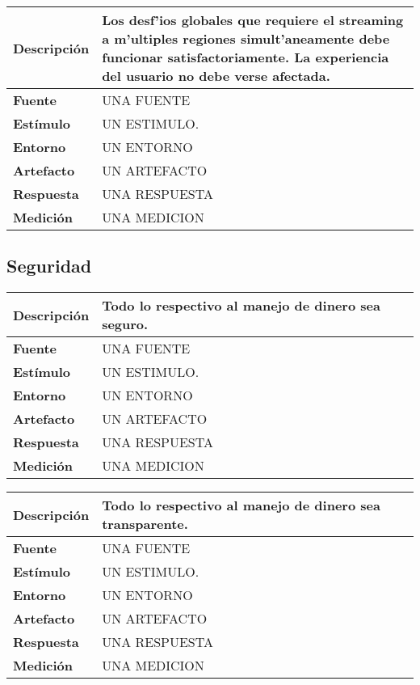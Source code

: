 \begin{center}
  \begin{tabular}{| l | p{10cm} | }
    \hline
  \textbf{Descripción} & Los desf'ios globales que requiere el streaming a m'ultiples regiones simult'aneamente debe funcionar satisfactoriamente. La experiencia del usuario no debe verse afectada.\\  \hline
  \textbf{Fuente} & UNA FUENTE\\  \hline
  \textbf{Estímulo} & UN ESTIMULO.\\  \hline
  \textbf{Entorno} & UN ENTORNO\\  \hline
  \textbf{Artefacto} & UN ARTEFACTO\\  \hline
  \textbf{Respuesta} & UNA RESPUESTA\\  \hline
  \textbf{Medición} & UNA MEDICION\\  \hline
  \end{tabular}
\end{center} 


\subsection{Seguridad}

\begin{center}
  \begin{tabular}{| l | p{10cm} | }
    \hline
  \textbf{Descripción} & Todo lo respectivo al manejo de dinero sea seguro.\\  \hline
  \textbf{Fuente} & UNA FUENTE\\  \hline
  \textbf{Estímulo} & UN ESTIMULO.\\  \hline
  \textbf{Entorno} & UN ENTORNO\\  \hline
  \textbf{Artefacto} & UN ARTEFACTO\\  \hline
  \textbf{Respuesta} & UNA RESPUESTA\\  \hline
  \textbf{Medición} & UNA MEDICION\\  \hline
  \end{tabular}
\end{center} 

\begin{center}
  \begin{tabular}{| l | p{10cm} | }
    \hline
  \textbf{Descripción} & Todo lo respectivo al manejo de dinero sea transparente.\\  \hline
  \textbf{Fuente} & UNA FUENTE\\  \hline
  \textbf{Estímulo} & UN ESTIMULO.\\  \hline
  \textbf{Entorno} & UN ENTORNO\\  \hline
  \textbf{Artefacto} & UN ARTEFACTO\\  \hline
  \textbf{Respuesta} & UNA RESPUESTA\\  \hline
  \textbf{Medición} & UNA MEDICION\\  \hline
  \end{tabular}
\end{center} 

